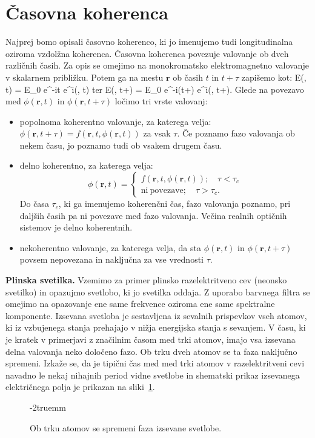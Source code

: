 \section{Časovna koherenca}
Najprej bomo opisali časovno koherenco, ki jo imenujemo tudi longitudinalna 
oziroma vzdolžna koherenca. Časovna koherenca povezuje valovanje ob dveh različnih 
časih. Za opis se omejimo na monokromatsko elektromagnetno valovanje v skalarnem približku. 
Potem ga na mestu $\mathbf{r}$ ob časih $t$ in $t+\tau$ zapišemo kot:
\beq
E(, t) = E_0 e^{-i\omega t} e^{i\phi(, t)}
\eeq
ter
\beq
E(, t+\tau) = E_0 e^{-i\omega (t+\tau)} e^{i\phi(, t+\tau)}.
\eeq
Glede na povezavo med $\phi(\mathbf{r}, t)$ in $\phi(\mathbf{r}, t+\tau)$ 
ločimo tri vrste valovanj:
\begin{itemize}
 \item popolnoma koherentno valovanje, za katerega velja: $\phi(\mathbf{r}, t+\tau) = 
 f(\mathbf{r}, t, \phi(\mathbf{r}, t))$ za vsak $\tau$. Če poznamo fazo valovanja ob 
 nekem času, jo poznamo tudi ob vsakem drugem času.
 \item delno koherentno, za katerega velja:
\begin{equation}
\phi(\mathbf{r}, t)=\begin{cases}
f(\mathbf{r}, t, \phi(\mathbf{r}, t)); \quad \tau < \tau_c\\
\mathrm{ni~povezave}; \quad \tau > \tau_c.
\end{cases}
\label{eq:gauss-eksponent}
\end{equation}
Do časa $\tau_c$, ki ga imenujemo koherenčni čas, fazo valovanja 
poznamo, pri daljših časih pa ni povezave med fazo valovanja. Večina
realnih optičnih sistemov je delno koherentnih.
 \item nekoherentno valovanje, za katerega velja, da
 sta $\phi(\mathbf{r}, t)$ in $\phi(\mathbf{r}, t+\tau)$
 povsem nepovezana in naključna za vse vrednosti $\tau$.
\end{itemize}
\begin{example}{\bf Plinska svetilka.}
Vzemimo za primer plinsko razelektritveno cev (neonsko svetilko) in 
opazujmo svetlobo, ki jo svetilka oddaja. Z uporabo barvnega 
filtra se omejimo na opazovanje ene same frekvence oziroma 
ene same spektralne komponente. Izsevana svetloba je sestavljena iz
sevalnih prispevkov vseh atomov, ki iz vzbujenega stanja prehajajo v 
nižja energijska stanja s sevanjem. V času, ki je kratek v primerjavi 
z značilnim časom med trki atomov, imajo vsa izsevana delna valovanja 
neko določeno fazo. Ob trku dveh atomov se ta faza naključno spremeni. 
Izkaže se, da je tipični čas med med trki atomov v razelektritveni cevi 
navadno le nekaj nihajnih period vidne svetlobe in shematski prikaz
izsevanega električnega polja je prikazan na sliki~\ref{fig:08_neon}.
\begin{figure}[h!]
\centering
\def\svgwidth{100truemm} 

\caption{Ob trku atomov se spremeni faza izsevane svetlobe.  
}
\label{fig:08_neon}
\vglue-2truemm
\end{figure}
\end{example}

